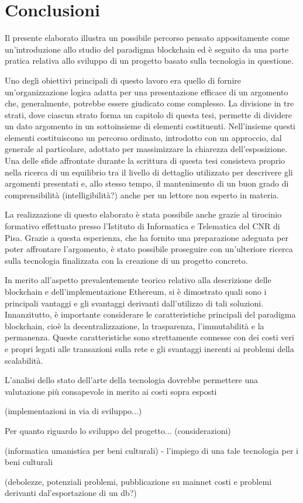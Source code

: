 \chapter{Conclusioni}

Il presente elaborato illustra un possibile percorso pensato appositamente come un’introduzione allo studio del paradigma blockchain ed è seguito da una parte pratica relativa allo sviluppo di un progetto basato sulla tecnologia in questione.

Uno degli obiettivi principali di questo lavoro era quello di fornire un'organizzazione logica adatta per una presentazione efficace di un argomento che, generalmente, potrebbe essere giudicato come complesso. La divisione in tre strati, dove ciascun strato forma un capitolo di questa tesi, permette di dividere un dato argomento in un sottoinsieme di elementi costituenti. Nell’insieme questi elementi costituiscono un percorso ordinato, introdotto con un approccio, dal generale al particolare, adottato per massimizzare la chiarezza dell’esposizione. Una delle sfide affrontate durante la scrittura di questa tesi consisteva proprio nella ricerca di un equilibrio tra il livello di dettaglio utilizzato per descrivere gli argomenti presentati e, allo stesso tempo, il mantenimento di un buon grado di comprensibilità (intelligibilità?) anche per un lettore non esperto in materia.

La realizzazione di questo elaborato è stata possibile anche grazie al tirocinio formativo effettuato presso l’Istituto di Informatica e Telematica del CNR di Pisa. Grazie a questa esperienza, che ha fornito una preparazione adeguata per poter affrontare l'argomento, è stato possibile proseguire con un’ulteriore ricerca sulla tecnologia finalizzata con la creazione di un progetto concreto.

In merito all'aspetto prevalentemente teorico relativo alla descrizione delle blockchain e dell'implementazione Ethereum, si è dimostrato quali sono i principali vantaggi e gli svantaggi derivanti dall'utilizzo di tali soluzioni. Innanzitutto, è importante considerare le caratteristiche principali del paradigma blockchain, cioè la decentralizzazione, la trasparenza, l'immutabilità e la permanenza. Queste caratteristiche sono strettamente connesse con dei costi veri e propri legati alle transazioni sulla rete e gli svantaggi inerenti ai problemi della scalabilità.

L'analisi dello stato dell'arte della tecnologia dovrebbe permettere una valutazione più consapevole in merito ai costi sopra esposti 

(implementazioni in via di sviluppo...)

Per quanto riguardo lo sviluppo del progetto...
(considerazioni)

(informatica umanistica per beni culturali) - l'impiego di una tale tecnologia per i beni culturali

(debolezze, potenziali problemi, pubblicazione su mainnet costi e problemi derivanti dal'esportazione di un db?)